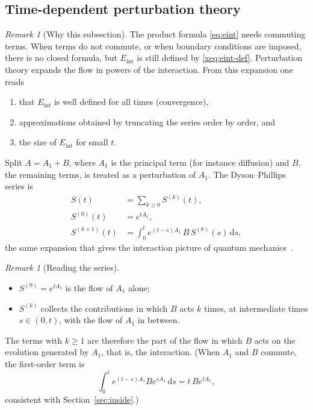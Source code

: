 \documentclass[11pt]{article}
\theoremstyle{plain}
\theoremstyle{definition}
\theoremstyle{remark}
\newtheorem{remark}[theorem]{Remark}
\newcommand{\dd}{\,\mathrm{d}}
\newcommand{\Eint}{E_{\mathrm{int}}}        %
\newenvironment{aside}[1]{\begin{remark}[#1]}{\end{remark}}
\begin{document}


\subsection{Time-dependent perturbation theory}
\begin{aside}{Why this subsection}
The product formula \eqref{eq:eint} needs commuting terms. When terms do not commute, or when boundary conditions are imposed, there is no closed formula, but $\Eint$ is still defined by \eqref{xeq:eint-def}. Perturbation theory expands the flow in powers of the interaction. From this expansion one reads
\begin{enumerate}[nosep,label=(\roman*)]
\item that $\Eint$ is well defined for all times (convergence),
\item approximations obtained by truncating the series order by order, and
\item the size of $\Eint$ for small $t$.
\end{enumerate}
\end{aside}

Split $A=A_1+B$, where $A_1$ is the principal term (for instance diffusion) and $B$, the remaining terms, is treated as a perturbation of $A_1$. The Dyson--Phillips series is
\begin{equation}\label{eq:dyson}
\begin{aligned}
S(t)&=\sum_{k\ge0}S^{(k)}(t),\\
S^{(0)}(t)&=e^{tA_1},\\
S^{(k+1)}(t)&=\int_0^te^{(t-s)A_1}\,B\,S^{(k)}(s)\dd s ,
\end{aligned}
\end{equation}
the same expansion that gives the interaction picture of quantum mechanics~\cite{dy}.

\begin{aside}{Reading the series}
\begin{itemize}[nosep]
\item $S^{(0)}=e^{tA_1}$ is the flow of $A_1$ alone;
\item $S^{(k)}$ collects the contributions in which $B$ acts $k$ times, at intermediate times $s\in(0,t)$, with the flow of $A_1$ in between.
\end{itemize}
The terms with $k\ge1$ are therefore the part of the flow in which $B$ acts on the evolution generated by $A_1$, that is, the interaction. (When $A_1$ and $B$ commute, the first-order term is
\[
\int_0^te^{(t-s)A_1}Be^{sA_1}\dd s=t\,Be^{tA_1},
\]
consistent with Section~\ref{sec:inside}.)
\end{aside}
\end{document}
